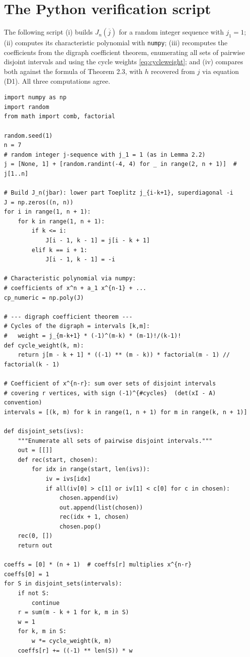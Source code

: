 \documentclass[11pt, fleqn]{amsart}
\theoremstyle{remark}
\begin{document}
\section{The Python verification script}\label{sec:script}

The following script (i) builds $J_n(\overline{j})$ for a random
integer sequence with $j_1 = 1$; (ii) computes its characteristic
polynomial with \texttt{numpy}; (iii) recomputes the coefficients from
the digraph coefficient theorem, enumerating all sets of pairwise
disjoint intervals and using the cycle weights
\eqref{eq:cycleweight}; and (iv) compares both against the formula of
Theorem 2.3, with $h$ recovered from $j$ via equation (D1). All three
computations agree.

\begin{lstlisting}
import numpy as np
import random
from math import comb, factorial

random.seed(1)
n = 7
# random integer j-sequence with j_1 = 1 (as in Lemma 2.2)
j = [None, 1] + [random.randint(-4, 4) for _ in range(2, n + 1)]  # j[1..n]

# Build J_n(jbar): lower part Toeplitz j_{i-k+1}, superdiagonal -i
J = np.zeros((n, n))
for i in range(1, n + 1):
    for k in range(1, n + 1):
        if k <= i:
            J[i - 1, k - 1] = j[i - k + 1]
        elif k == i + 1:
            J[i - 1, k - 1] = -i

# Characteristic polynomial via numpy:
# coefficients of x^n + a_1 x^{n-1} + ...
cp_numeric = np.poly(J)

# --- digraph coefficient theorem ---
# Cycles of the digraph = intervals [k,m]:
#   weight = j_{m-k+1} * (-1)^(m-k) * (m-1)!/(k-1)!
def cycle_weight(k, m):
    return j[m - k + 1] * ((-1) ** (m - k)) * factorial(m - 1) // factorial(k - 1)

# Coefficient of x^{n-r}: sum over sets of disjoint intervals
# covering r vertices, with sign (-1)^{#cycles}  (det(xI - A) convention)
intervals = [(k, m) for k in range(1, n + 1) for m in range(k, n + 1)]

def disjoint_sets(ivs):
    """Enumerate all sets of pairwise disjoint intervals."""
    out = [[]]
    def rec(start, chosen):
        for idx in range(start, len(ivs)):
            iv = ivs[idx]
            if all(iv[0] > c[1] or iv[1] < c[0] for c in chosen):
                chosen.append(iv)
                out.append(list(chosen))
                rec(idx + 1, chosen)
                chosen.pop()
    rec(0, [])
    return out

coeffs = [0] * (n + 1)  # coeffs[r] multiplies x^{n-r}
coeffs[0] = 1
for S in disjoint_sets(intervals):
    if not S:
        continue
    r = sum(m - k + 1 for k, m in S)
    w = 1
    for k, m in S:
        w *= cycle_weight(k, m)
    coeffs[r] += ((-1) ** len(S)) * w


\end{lstlisting}
\end{document}
